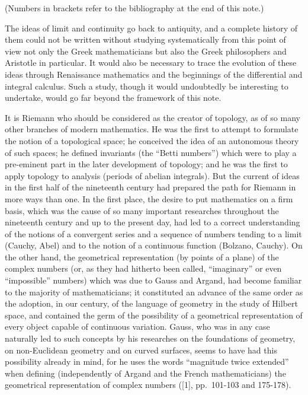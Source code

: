 
(Numbers in brackets refer to the bibliography at the end of this note.)

The ideas of limit and continuity go back to antiquity, and a complete history of them could not be written without studying systematically from this point of view not only the Greek mathematicians but also the Greek philosophers and Aristotle in particular. It would also be necessary to trace the evolution of these ideas through Renaissance mathematics and the beginnings of the differential and integral calculus. Such a study, though it would undoubtedly be interesting to undertake, would go far beyond the framework of this note.

It is Riemann who should be considered as the creator of topology, as of so many other branches of modern mathematics. He was the first to attempt to formulate the notion of a topological space; he conceived the idea of an autonomous theory of such spaces; he defined invariants (the ``Betti numbers'') which were to play a pre-eminent part in the later development of topology; and he was the first to apply topology to analysis (periods of abelian integrals). But the current of ideas in the first half of the nineteenth century had prepared the path for Riemann in more ways than one. In the first place, the desire to put mathematics on a firm basis, which was the cause of so many important researches throughout the nineteenth century and up to the present day, had led to a correct understanding of the notions of a convergent series and a sequence of numbers tending to a limit (Cauchy, Abel) and to the notion of a continuous function (Bolzano, Cauchy). On the other hand, the geometrical representation (by points of a plane) of the complex numbers (or, as they had hitherto been called, ``imaginary'' or even ``impossible'' numbers) which was due to Gauss and Argand, had become familiar to the majority of mathematicians; it constituted an advance of the same order as the adoption, in our century, of the language of geometry in the study of Hilbert space, and contained the germ of the possibility of a geometrical representation of every object capable of continuous variation. Gauss, who was in any case naturally led to such concepts by his researches on the foundations of geometry, on non-Euclidean geometry and on curved surfaces, seems to have had this possibility already in mind, for he uses the words ``magnitude twice extended'' when defining (independently of Argand and the French mathematicians) the geometrical representation of complex numbers ({[}1{]}, pp.~101-103 and 175-178).


